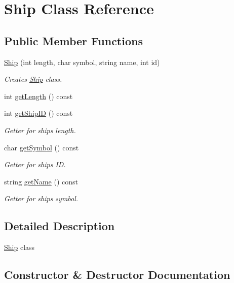\hypertarget{class_ship}{}\section{Ship Class Reference}
\label{class_ship}
\subsection*{Public Member Functions}
\begin{DoxyCompactItemize}
\item 
\mbox{\hyperlink{class_ship_abe066b007989f6ea92a1e139d78aed00}{Ship}} (int length, char symbol, string name, int id)
\begin{DoxyCompactList}\small\item\em Creates \mbox{\hyperlink{class_ship}{Ship}} class. \end{DoxyCompactList}\item 
int \mbox{\hyperlink{class_ship_a5c36a859d4600ba27c091fa9254faadd}{get\+Length}} () const
\item 
int \mbox{\hyperlink{class_ship_add61243cfbd60ea5fc3ab79d4ae0c99d}{get\+Ship\+ID}} () const
\begin{DoxyCompactList}\small\item\em Getter for ship\textquotesingle{}s length. \end{DoxyCompactList}\item 
char \mbox{\hyperlink{class_ship_a86ea5893e49e12ceeb6ff43a6f78d86d}{get\+Symbol}} () const
\begin{DoxyCompactList}\small\item\em Getter for ship\textquotesingle{}s ID. \end{DoxyCompactList}\item 
string \mbox{\hyperlink{class_ship_a714ac95242eb2f4c72c4a413ebeec256}{get\+Name}} () const
\begin{DoxyCompactList}\small\item\em Getter for ship\textquotesingle{}s symbol. \end{DoxyCompactList}\end{DoxyCompactItemize}


\subsection{Detailed Description}
\mbox{\hyperlink{class_ship}{Ship}} class 

\subsection{Constructor \& Destructor Documentation}
\mbox{\label{class_ship_abe066b007989f6ea92a1e139d78aed00}} 
